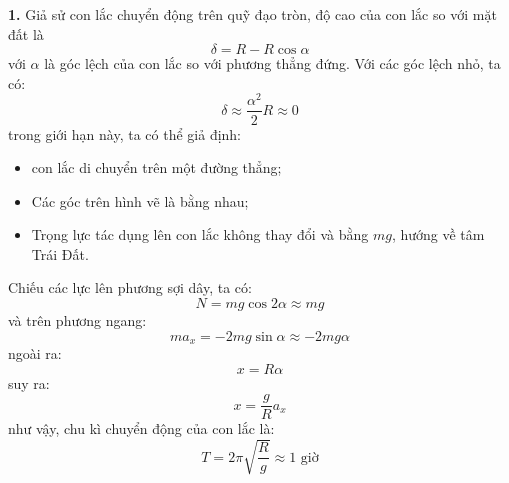 \noindent\textbf{1.} Giả sử con lắc chuyển động trên quỹ đạo tròn, độ cao của con lắc so với mặt đất là
\begin{equation*}
  \delta=R-R\cos\alpha
\end{equation*}
với $\alpha$ là góc lệch của con lắc so với phương thẳng đứng. Với các góc lệch nhỏ, ta có:
\begin{equation*}
  \delta \approx \frac{\alpha^{2}}{2}R\approx 0
\end{equation*}
trong giới hạn này, ta có thể giả định:
\begin{itemize}
  \item con lắc di chuyển trên một đường thẳng;
  \item Các góc trên hình vẽ là bằng nhau;
  \item Trọng lực tác dụng lên con lắc không thay đổi và bằng $mg$, hướng về tâm Trái Đất.
\end{itemize}
Chiếu các lực lên phương sợi dây, ta có:
\begin{equation*}
  N=mg\cos 2\alpha\approx mg
\end{equation*}
và trên phương ngang:
\begin{equation*}
  ma_{x}=-2mg\sin\alpha\approx-2mg\alpha
\end{equation*}
ngoài ra:
\begin{equation*}
  x=R\alpha
\end{equation*}
suy ra:
\begin{equation*}
  x=\frac{g}{R}a_{x}
\end{equation*}
như vậy, chu kì chuyển động của con lắc là:
\begin{equation*}
  T=2\pi\sqrt{\frac{R}{g}}\approx 1 \text{ giờ}
\end{equation*}

